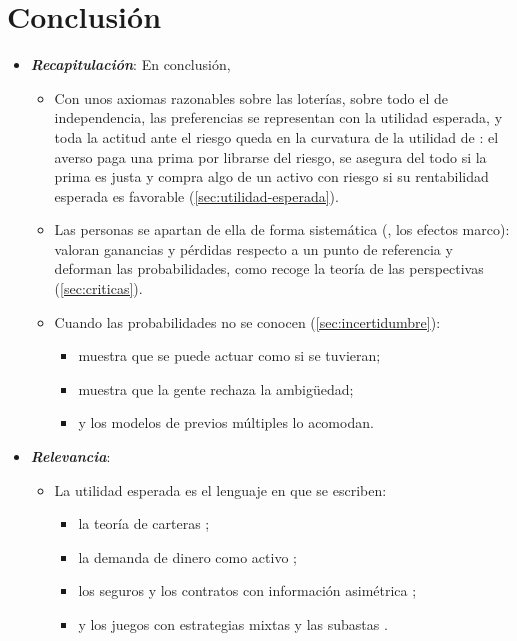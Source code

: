 \documentclass[11pt]{article}
\begin{document}
\section*{Conclusión}

\begin{itemize}
\item \textbf{\emph{Recapitulación}}: En conclusión,
  \begin{itemize}
  \item Con unos axiomas razonables sobre las loterías, sobre todo el de independencia, las preferencias se representan con la utilidad esperada, y toda la actitud ante el riesgo queda en la curvatura de la utilidad de : el averso paga una prima por librarse del riesgo, se asegura del todo si la prima es justa y compra algo de un activo con riesgo si su rentabilidad esperada es favorable (\ref{sec:utilidad-esperada}).
  \item Las personas se apartan de ella de forma sistemática (, los efectos marco): valoran ganancias y pérdidas respecto a un punto de referencia y deforman las probabilidades, como recoge la teoría de las perspectivas (\ref{sec:criticas}).
  \item Cuando las probabilidades no se conocen (\ref{sec:incertidumbre}):
    \begin{itemize}
    \item {} muestra que se puede actuar como si se tuvieran;
    \item {} muestra que la gente rechaza la ambigüedad;
    \item y los modelos de previos múltiples lo acomodan.
    \end{itemize}
  \end{itemize}
\item \textbf{\emph{Relevancia}}:
  \begin{itemize}
  \item La utilidad esperada es el lenguaje en que se escriben:
  \begin{itemize}
  \item la teoría de carteras ;
  \item la demanda de dinero como activo ;
  \item los seguros y los contratos con información asimétrica ;
  \item y los juegos con estrategias mixtas y las subastas .

\end{itemize}
\end{itemize}
\end{itemize}
\end{document}
